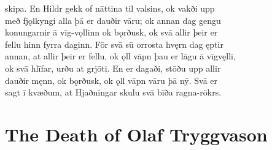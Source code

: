 \documentclass[12pt,letterpaper]{book}
\newcommand\emptypage{\clearpage{\pagestyle{empty}\cleardoublepage}}
\begin{document}
\begin{linenumbers}
skipa.  En Hildr gekk of nāttina til valsins, ok vakði upp\\
með fjǫlkyngi alla þā er dauðir vāru; ok annan dag gengu\\
konungarnir ā vīg-vǫllinn ok bǫrðusk, ok svā allir þeir er\\
fellu hinn fyrra daginn.  Fōr svā sū orrosta hvęrn dag ęptir\\
annan, at allir þeir er fellu, ok ǫll vāpn þau er lāgu ā vīgvęlli,\\
ok svā hlīfar, urðu at grjōti.  En er dagaði, stōðu upp allir\\
dauðir męnn, ok bǫrðusk, ok ǫll vāpn vāru þā nȳ.  Svā er\\
sagt ī kvæðum, at Hjaðningar skulu svā bīða ragna-rökrs.

\end{linenumbers}

\emptypage

\chapter{The Death of Olaf Tryggvason}
\end{document}
